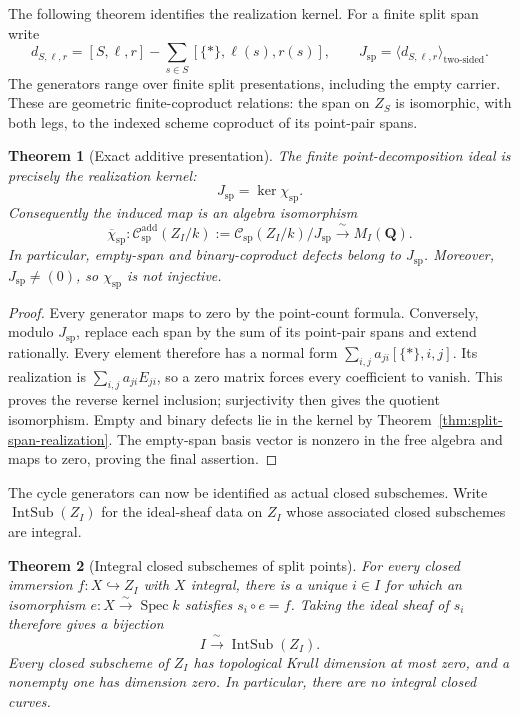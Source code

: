 \documentclass[11pt]{article}
\newtheorem{theorem}{Theorem}[section]
\theoremstyle{definition}
\theoremstyle{remark}
\DeclareMathOperator{\Spec}{Spec}
\newcommand{\Q}{\mathbf Q}
\begin{document}
The following theorem identifies the realization kernel.  For a finite split span write
\[
  d_{S,\ell,r}=[S,\ell,r]
    -\sum_{s\in S}[\{*\},\ell(s),r(s)],
  \qquad
  J_{\mathrm{sp}}=\bigl\langle d_{S,\ell,r}\bigr\rangle_{\text{two-sided}}.
\]
The generators range over finite split presentations, including the empty
carrier.  These are geometric finite-coproduct relations: the span on
\(Z_S\) is isomorphic, with both legs, to the indexed scheme coproduct of
its point-pair spans.

\begin{theorem}[Exact additive presentation]
\label{thm:split-span-additive-quotient}
The finite point-decomposition ideal is precisely the realization kernel:
\[
  J_{\mathrm{sp}}=\ker\chi_{\mathrm{sp}}.
\]
Consequently the induced map is an algebra isomorphism
\[
  \overline\chi_{\mathrm{sp}}:
  \mathcal C_{\mathrm{sp}}^{\mathrm{add}}(Z_I/k)
    :=\mathcal C_{\mathrm{sp}}(Z_I/k)/J_{\mathrm{sp}}
       \xrightarrow{\ \sim\ }M_I(\Q).
\]
In particular, empty-span and binary-coproduct defects belong to
\(J_{\mathrm{sp}}\).  Moreover, \(J_{\mathrm{sp}}\ne(0)\), so
\(\chi_{\mathrm{sp}}\) is not injective.
\end{theorem}

\begin{proof}
Every generator maps to zero by the point-count formula.  Conversely,
modulo \(J_{\mathrm{sp}}\), replace each span by the sum of its point-pair
spans and extend rationally.  Every element therefore has a normal form
\(\sum_{i,j}a_{ji}[\{*\},i,j]\).  Its realization is
\(\sum_{i,j}a_{ji}E_{ji}\), so a zero matrix forces every coefficient
to vanish.  This proves the reverse kernel inclusion; surjectivity then
gives the quotient isomorphism.  Empty and binary defects lie in the
kernel by Theorem~\ref{thm:split-span-realization}.
The empty-span basis vector is nonzero in the free algebra and maps to
zero, proving the final assertion.
\end{proof}

The cycle generators can now be identified as actual closed subschemes.
Write \(\operatorname{IntSub}(Z_I)\) for the ideal-sheaf data on \(Z_I\)
whose associated closed subschemes are integral.

\begin{theorem}[Integral closed subschemes of split points]
\label{thm:split-integral-subschemes}
For every closed immersion \(f:X\hookrightarrow Z_I\) with \(X\)
integral, there is a unique \(i\in I\) for which an isomorphism
\(e:X\xrightarrow{\sim}\Spec k\) satisfies \(s_i\circ e=f\).
Taking the ideal sheaf of \(s_i\) therefore gives a bijection
\[
  I\xrightarrow{\ \sim\ }\operatorname{IntSub}(Z_I).
\]
Every closed subscheme of \(Z_I\) has topological Krull dimension at
most zero, and a nonempty one has dimension zero.  In particular, there
are no integral closed curves.
\end{theorem}
\end{document}
